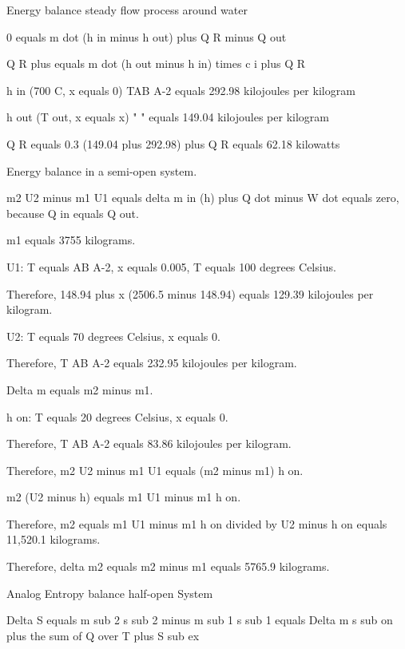 Energy balance steady flow process around water

0 equals m dot (h in minus h out) plus Q R minus Q out

Q R plus equals m dot (h out minus h in) times c i plus Q R

h in (700 C, x equals 0) TAB A-2 equals 292.98 kilojoules per kilogram

h out (T out, x equals x) " " equals 149.04 kilojoules per kilogram

Q R equals 0.3 (149.04 plus 292.98) plus Q R equals 62.18 kilowatts

Energy balance in a semi-open system.

m2 U2 minus m1 U1 equals delta m in (h) plus Q dot minus W dot equals zero, because Q in equals Q out.

m1 equals 3755 kilograms.

U1: T equals AB A-2, x equals 0.005, T equals 100 degrees Celsius.

Therefore, 148.94 plus x (2506.5 minus 148.94) equals 129.39 kilojoules per kilogram.

U2: T equals 70 degrees Celsius, x equals 0.

Therefore, T AB A-2 equals 232.95 kilojoules per kilogram.

Delta m equals m2 minus m1.

h on: T equals 20 degrees Celsius, x equals 0.

Therefore, T AB A-2 equals 83.86 kilojoules per kilogram.

Therefore, m2 U2 minus m1 U1 equals (m2 minus m1) h on.

m2 (U2 minus h) equals m1 U1 minus m1 h on.

Therefore, m2 equals m1 U1 minus m1 h on divided by U2 minus h on equals 11,520.1 kilograms.

Therefore, delta m2 equals m2 minus m1 equals 5765.9 kilograms.

Analog Entropy balance half-open System

Delta S equals m sub 2 s sub 2 minus m sub 1 s sub 1 equals Delta m s sub on plus the sum of Q over T plus S sub ex